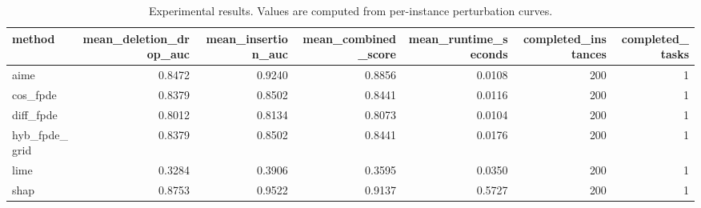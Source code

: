 \begin{table}[t]
\caption{Experimental results. Values are computed from per-instance perturbation curves.}
\label{tab:main_results_computed}
\centering
\begin{tabular}{lrrrrrr}
\toprule
method & mean\_deletion\_drop\_auc & mean\_insertion\_auc & mean\_combined\_score & mean\_runtime\_seconds & completed\_instances & completed\_tasks \\
\midrule
aime & 0.8472 & 0.9240 & 0.8856 & 0.0108 & 200 & 1 \\
cos\_fpde & 0.8379 & 0.8502 & 0.8441 & 0.0116 & 200 & 1 \\
diff\_fpde & 0.8012 & 0.8134 & 0.8073 & 0.0104 & 200 & 1 \\
hyb\_fpde\_grid & 0.8379 & 0.8502 & 0.8441 & 0.0176 & 200 & 1 \\
lime & 0.3284 & 0.3906 & 0.3595 & 0.0350 & 200 & 1 \\
shap & 0.8753 & 0.9522 & 0.9137 & 0.5727 & 200 & 1 \\
\bottomrule
\end{tabular}

\end{table}
